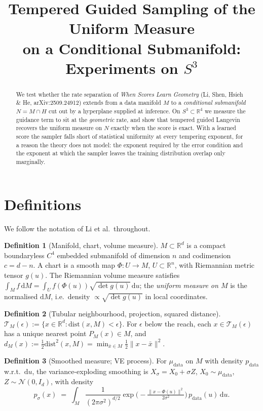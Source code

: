 \documentclass[10pt]{article}
\title{Tempered Guided Sampling of the Uniform Measure\\on a Conditional Submanifold: Experiments on $S^3$}
\author{}
\date{}
\theoremstyle{definition}
\newtheorem{definition}{Definition}
\theoremstyle{plain}
\newcommand{\pdata}{p_{\mathrm{data}}}
\newcommand{\mdata}{\mu_{\mathrm{data}}}
\newcommand{\R}{\mathbb{R}}
\newcommand{\TM}{\mathcal{T}_M}
\newcommand{\dM}{d_M}
\begin{document}
\maketitle
\vspace{-3em}

\begin{abstract}
\noindent
We test whether the rate separation of \emph{When Scores Learn Geometry}
(Li, Shen, Hsieh \& He, arXiv:2509.24912) extends from a data manifold $M$ to a
\emph{conditional submanifold} $N = M \cap H$ cut out by a hyperplane supplied
at inference. On $S^3 \subset \R^4$ we measure the guidance term to sit at the
\emph{geometric} rate, and show that tempered guided Langevin recovers the
uniform measure on $N$ exactly when the score is exact. With a learned score the
sampler falls short of statistical uniformity at every tempering exponent, for a
reason the theory does not model: the exponent required by the error condition
and the exponent at which the sampler leaves the training distribution overlap
only marginally.
\end{abstract}

\section{Definitions}

We follow the notation of Li et al.\ throughout.

\begin{definition}[Manifold, chart, volume measure]
$M \subset \R^d$ is a compact boundaryless $C^4$ embedded submanifold of
dimension $n$ and codimension $c = d-n$. A chart is a smooth map
$\Phi : U \to M$, $U \subset \R^n$, with Riemannian metric tensor $g(u)$. The
Riemannian volume measure satisfies
$\int_M f\, \mathrm{d}M = \int_U f(\Phi(u)) \sqrt{\det g(u)}\, \mathrm{d}u$;
the \emph{uniform measure on $M$} is the normalised $\mathrm{d}M$, i.e.\ density
$\propto \sqrt{\det g(u)}$ in local coordinates.
\end{definition}

\begin{definition}[Tubular neighbourhood, projection, squared distance]
$\TM(\epsilon) := \{x \in \R^d : \mathrm{dist}(x,M) < \epsilon\}$. For
$\epsilon$ below the reach, each $x \in \TM(\epsilon)$ has a unique nearest
point $P_M(x) \in M$, and
$\dM(x) := \tfrac12 \mathrm{dist}^2(x,M) = \min_{\bar{x}\in M} \tfrac12\|x-\bar x\|^2$.
\end{definition}

\begin{definition}[Smoothed measure; VE process]
For $\mdata$ on $M$ with density $\pdata$ w.r.t.\ $\mathrm{d}u$, the
variance-exploding smoothing is $X_\sigma = X_0 + \sigma Z$,
$X_0 \sim \mdata$, $Z \sim \mathcal{N}(0,I_d)$, with density
\begin{equation}
p_\sigma(x) \;=\; \int_M \frac{1}{(2\pi\sigma^2)^{d/2}}
  \exp\!\Big(-\tfrac{\|x - \Phi(u)\|^2}{2\sigma^2}\Big)\, \pdata(u)\, \mathrm{d}u .
\end{equation}
\end{definition}
\end{document}
